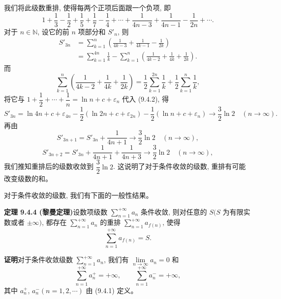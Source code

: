 \documentclass[UTF8, 12pt, fontset=fandol, oneside]{ctexart}
\begin{document}
我们将此级数重排, 使得每两个正项后面跟一个负项, 即
\[
  1+\frac13-\frac12+\frac15+\frac17-\frac14+\cdots+\frac1{4n-3}+\frac1{4n-1}-\frac1{2n}+\cdots.
\]
对于 $n\in\mathbb{N}$, 设它的前 $n$ 项部分和 $S'_n$, 则
\[
\begin{aligned}
  S'_{3n}
  &=\sum_{k=1}^n\left(\frac1{4k-3}+\frac1{4k-1}-\frac1{2k}\right)\\
  &=\sum_{k=1}^{4n}\frac1k-\sum_{k=1}^n\left(\frac1{4k-2}+\frac1{4k}+\frac1{2k}\right).
\end{aligned}
  \tag{9.4.2}
\]
而
\[
  \sum_{k=1}^n\left(\frac1{4k-2}+\frac1{4k}+\frac1{2k}\right)
  =\frac12\sum_{k=1}^{2n}\frac1k+\frac12\sum_{k=1}^n\frac1k,
\]
将它与 $1+\dfrac12+\cdots+\dfrac1n=\ln n+c+\varepsilon_n$ 代入 (9.4.2), 得
\[
  S'_{3n}
  =\ln4n+c+\varepsilon_{4n}
  -\frac12(\ln2n+c+\varepsilon_{2n})
  -\frac12(\ln n+c+\varepsilon_n)\to\frac32\ln2\quad(n\to\infty).
\]
再由
\[
  S'_{3n+1}=S'_{3n}+\frac1{4n+1}\to\frac32\ln2\quad(n\to\infty),
\]
\[
  S'_{3n+2}=S'_{3n}+\frac1{4n+1}+\frac1{4n+3}\to\frac32\ln2\quad(n\to\infty),
\]
我们推知重排后的级数收敛到 $\dfrac32\ln2$. 这说明了对于条件收敛的级数, 重排有可能改变级数的和。

对于条件收敛的级数, 我们有下面的一般性结果。

\noindent\textbf{定理 9.4.4 (黎曼定理)}\quad 设数项级数 $\sum\limits_{n=1}^{+\infty}a_n$ 条件收敛, 则对任意的 $S(S$ 为有限实数或者 $\pm\infty)$, 都存在 $\sum\limits_{n=1}^{+\infty}a_n$ 的重排 $\sum\limits_{n=1}^{+\infty}a_{f(n)}$, 使得
\[
  \sum_{n=1}^{+\infty}a_{f(n)}=S.
\]

\noindent\textbf{证明}\quad 对于条件收敛级数 $\sum\limits_{n=1}^{+\infty}a_n$, 我们有 $\lim\limits_{n\to\infty}a_n=0$ 和
\[
  \sum_{n=1}^{+\infty}a_n^+=+\infty,\qquad \sum_{n=1}^{+\infty}a_n^-=+\infty,
\]
其中 $a_n^+$, $a_n^-(n=1,2,\cdots)$ 由 (9.4.1) 定义。
\end{document}
